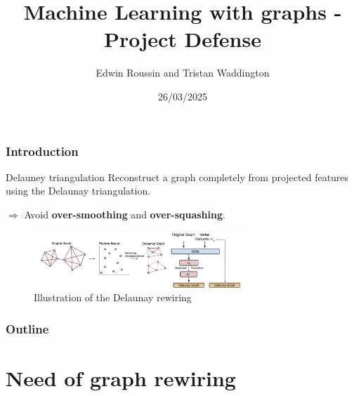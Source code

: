\documentclass[10pt, aspectratio = 169]{beamer}
\title{Machine Learning with graphs - Project Defense}
\subtitle{Delaunay Graph: Addressing Over-Squashing and Over-Smoothing Using
Delaunay Triangulation\\
by Attali H., Duscaldi D. and Pernelle N. \texorpdfstring{\cite{attali2024delaunay}}}
\author{Edwin Roussin and Tristan Waddington}
\institute{IP-Paris, CEMST}
\date{26/03/2025}
\begin{document}
\begin{frame}
    \titlepage
\end{frame}

\begin{frame}
    \frametitle{Introduction}
    \begin{block}{Delauney triangulation}
    Reconstruct a graph completely from projected features using the Delaunay triangulation.

    $\Rightarrow$ Avoid \textbf{over-smoothing} and \textbf{over-squashing}.
    \end{block}
    
    \begin{figure}
        \includegraphics[width=0.7\textwidth]{figures/Delaunay-Rewiring.png}
        \caption{Illustration of the Delaunay rewiring \cite[Attali al., 2024]{attali2024delaunay}}
    \end{figure}
\end{frame}


\begin{frame}
    \frametitle{Outline}
    \tableofcontents
\end{frame}

\section{Need of graph rewiring}
\end{document}
